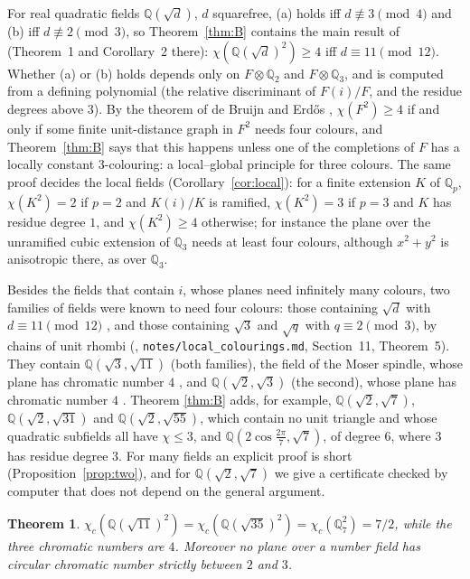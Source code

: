 \documentclass[11pt,a4paper]{amsart}
\newtheorem{theorem}{Theorem}
\theoremstyle{remark}
\newcommand{\Q}{\mathbb{Q}}
\begin{document}
For real quadratic fields $\Q(\sqrt d)$, $d$ squarefree, (a) holds iff $d\not\equiv3\pmod4$ and (b) iff
$d\not\equiv2\pmod3$, so Theorem~\ref{thm:B} contains the main result of \cite{FC} (Theorem~1 and Corollary~2
there): $\chi(\Q(\sqrt d)^2)\ge4$ iff $d\equiv11\pmod{12}$. Whether (a) or (b) holds depends only on $F\otimes\Q_2$ and $F\otimes\Q_3$, and is computed from
a defining polynomial (the relative discriminant of $F(i)/F$, and the residue degrees above $3$). By the theorem of
de Bruijn and Erd\H{o}s \cite{dBE}, $\chi(F^2)\ge4$ if and only if some finite unit-distance graph in $F^2$ needs four
colours, and Theorem~\ref{thm:B} says that this happens unless one of the completions of $F$ has a locally constant
$3$-colouring: a local--global principle for three colours. The same proof decides the local fields
(Corollary~\ref{cor:local}): for a finite extension $K$ of $\Q_p$, $\chi(K^2)=2$ if $p=2$ and $K(i)/K$ is ramified,
$\chi(K^2)=3$ if $p=3$ and $K$ has residue degree $1$, and $\chi(K^2)\ge4$ otherwise; for instance the plane over the
unramified cubic extension of $\Q_3$ needs at least four colours, although $x^2+y^2$ is anisotropic there, as over
$\Q_3$.

Besides the fields that contain $i$, whose planes need infinitely many colours, two families of fields were known to
need four colours: those containing $\sqrt d$ with $d\equiv11\pmod{12}$ \cite{FC}, and those containing $\sqrt3$ and
$\sqrt q$ with $q\equiv2\pmod3$, by chains of unit rhombi (\cite{Repo}, \nolinkurl{notes/local_colourings.md},
Section~11, Theorem~5). They contain $\Q(\sqrt3,\sqrt{11})$ (both families), the field of the Moser spindle, whose
plane has chromatic number $4$ \cite{Fischer1994,MM}, and $\Q(\sqrt2,\sqrt3)$ (the second), whose plane has chromatic
number $4$ \cite{P4C}. Theorem
\ref{thm:B} adds, for example, $\Q(\sqrt2,\sqrt7)$, $\Q(\sqrt2,\sqrt{31})$ and $\Q(\sqrt2,\sqrt{55})$, which contain
no unit triangle and whose quadratic subfields all have $\chi\le3$, and $\Q(2\cos\frac{2\pi}7,\sqrt7)$, of degree
$6$, where $3$ has residue degree $3$. For many fields an explicit proof is short (Proposition~\ref{prop:two}), and
for $\Q(\sqrt2,\sqrt7)$ we give a certificate checked by computer that does not depend on the general argument.

\begin{theorem}\label{thm:C}
$\chi_c(\Q(\sqrt{11})^2)=\chi_c(\Q(\sqrt{35})^2)=\chi_c(\Q_7^2)=7/2$, while the three chromatic numbers are $4$.
Moreover no plane over a number field has circular chromatic number strictly between $2$ and $3$.
\end{theorem}
\end{document}
